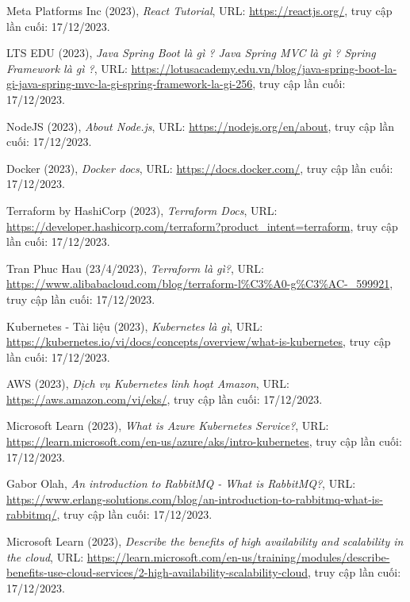 \cleardoublepage
{}
{}

\begin{thebibliography}{1}

Meta Platforms Inc (2023), \emph{React Tutorial}, URL: \url{https://reactjs.org/}, truy cập lần cuối: 17/12/2023.

LTS EDU (2023), \emph{Java Spring Boot là gì ? Java Spring MVC là gì ? Spring Framework là gì ?}, URL: \url{https://lotusacademy.edu.vn/blog/java-spring-boot-la-gi-java-spring-mvc-la-gi-spring-framework-la-gi-256}, truy cập lần cuối: 17/12/2023.

NodeJS (2023), \emph{About Node.js}, URL: \url{https://nodejs.org/en/about}, truy cập lần cuối: 17/12/2023.

Docker (2023), \emph{Docker docs}, URL: \url{https://docs.docker.com/}, truy cập lần cuối: 17/12/2023.

Terraform by HashiCorp (2023), \emph{Terraform Docs}, URL: \url{https://developer.hashicorp.com/terraform?product_intent=terraform}, truy cập lần cuối: 17/12/2023.

Tran Phuc Hau (23/4/2023), \emph{Terraform là gì?}, URL: \url{https://www.alibabacloud.com/blog/terraform-l%C3%A0-g%C3%AC-_599921}, truy cập lần cuối: 17/12/2023.

Kubernetes - Tài liệu (2023), \emph{Kubernetes là gì}, URL: \url{https://kubernetes.io/vi/docs/concepts/overview/what-is-kubernetes}, truy cập lần cuối: 17/12/2023.

AWS (2023), \emph{Dịch vụ Kubernetes linh hoạt Amazon}, URL: \url{https://aws.amazon.com/vi/eks/}, truy cập lần cuối: 17/12/2023.

Microsoft Learn (2023), \emph{What is Azure Kubernetes Service?}, URL: \url{https://learn.microsoft.com/en-us/azure/aks/intro-kubernetes}, truy cập lần cuối: 17/12/2023.

Gabor Olah, \emph{An introduction to RabbitMQ - What is RabbitMQ?}, URL: \url{https://www.erlang-solutions.com/blog/an-introduction-to-rabbitmq-what-is-rabbitmq/}, truy cập lần cuối: 17/12/2023.

Microsoft Learn (2023), \emph{Describe the benefits of high availability and scalability in the cloud}, URL: \url{https://learn.microsoft.com/en-us/training/modules/describe-benefits-use-cloud-services/2-high-availability-scalability-cloud}, truy cập lần cuối: 17/12/2023.


\end{thebibliography}

